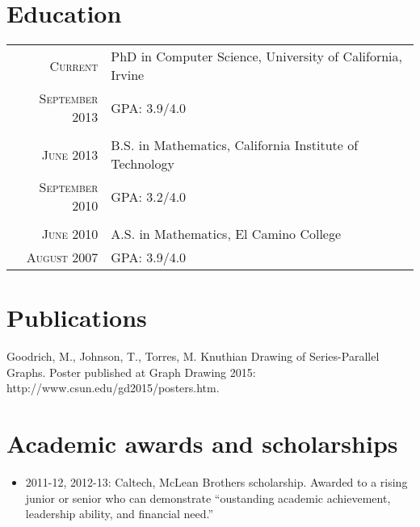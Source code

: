 \documentclass[a4paper,10pt]{article} %
\begin{document}

\section{Education}

\begin{tabular}{r|l}	
\textsc{Current} & PhD in Computer Science, University of California, Irvine\\
\textsc{September 2013} &\normalsize \textsc{GPA}: 3.9/4.0 \\
\multicolumn{2}{c}{} \\


\textsc{June 2013} & B.S. in Mathematics, California Institute of Technology \\
\textsc{September 2010} &\normalsize \textsc{GPA}: 3.2/4.0 \\
\multicolumn{2}{c}{} \\


\textsc{June 2010} & A.S. in Mathematics, El Camino College \\
\textsc{August 2007} & \textsc{GPA}: 3.9/4.0 \\

\end{tabular}

\section{Publications}
Goodrich, M., Johnson, T., Torres, M. Knuthian Drawing of Series-Parallel Graphs. Poster published at Graph Drawing 2015: http://www.csun.edu/gd2015/posters.htm.

\section{Academic awards and scholarships}

\begin{itemize}
\item \textsc{2011-12, 2012-13}: Caltech, McLean Brothers scholarship. Awarded to a rising junior or senior who can demonstrate ``oustanding academic achievement, leadership ability, and financial need.'' 
\end{itemize}
\end{document}
